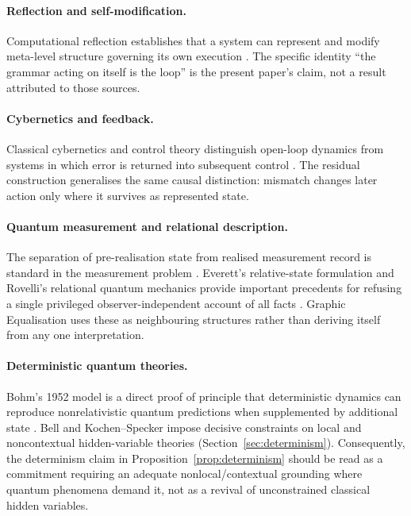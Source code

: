 \documentclass[11pt,a4paper]{article}
\theoremstyle{remark}\newtheorem{remark}[definition]{Remark}
\begin{document}
\paragraph{Reflection and self-modification.} Computational reflection establishes that a system can represent and modify meta-level structure governing its own execution \citep{smith1982,maes1987}. The specific identity ``the grammar acting on itself is the loop'' is the present paper's claim, not a result attributed to those sources.

\paragraph{Cybernetics and feedback.} Classical cybernetics and control theory distinguish open-loop dynamics from systems in which error is returned into subsequent control \citep{wiener1948,ashby1956}. The residual construction generalises the same causal distinction: mismatch changes later action only where it survives as represented state.

\paragraph{Quantum measurement and relational description.} The separation of pre-realisation state from realised measurement record is standard in the measurement problem \citep{vonneumann1955}. Everett's relative-state formulation and Rovelli's relational quantum mechanics provide important precedents for refusing a single privileged observer-independent account of all facts \citep{everett1957,rovelli1996}. Graphic Equalisation uses these as neighbouring structures rather than deriving itself from any one interpretation.

\paragraph{Deterministic quantum theories.} Bohm's 1952 model is a direct proof of principle that deterministic dynamics can reproduce nonrelativistic quantum predictions when supplemented by additional state \citep{bohm1952}. Bell and Kochen--Specker impose decisive constraints on local and noncontextual hidden-variable theories (Section~\ref{sec:determinism}). Consequently, the determinism claim in Proposition~\ref{prop:determinism} should be read as a commitment requiring an adequate nonlocal/contextual grounding where quantum phenomena demand it, not as a revival of unconstrained classical hidden variables.
\end{document}
